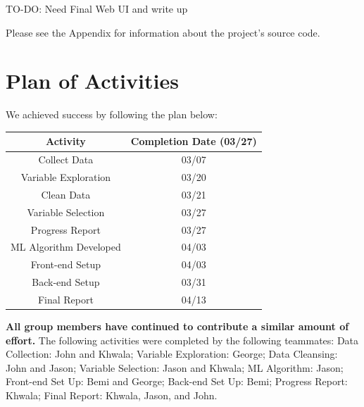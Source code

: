\documentclass[sigconf,nonacm,11pt]{acmart}
\begin{document}
\vspace{0.75em}
TO-DO: Need Final Web UI and write up

Please see the Appendix for information about the project's source code.




\section{Plan of Activities}

We achieved success by following the plan below:\vspace{0.07em}
\begin{center}
    \begin{tabular}{||c|c||}
    \hline
    Activity & Completion Date (03/27)\\
    \hline\hline
    Collect Data & 03/07\\
    Variable Exploration & 03/20\\
    Clean Data & 03/21\\
    Variable Selection & 03/27\\
    Progress Report & 03/27\\
    ML Algorithm Developed & 04/03\\
    Front-end Setup & 04/03\\
    Back-end Setup & 03/31\\
    Final Report & 04/13\\
    \hline
    \end{tabular}
\end{center}

\textbf{All group members have continued to contribute a similar amount of effort.} The following activities were completed by the following teammates: Data Collection: John and Khwala; Variable Exploration: George; Data Cleansing: John and Jason; Variable Selection: Jason and Khwala; ML Algorithm: Jason; Front-end Set Up: Bemi and George; Back-end Set Up: Bemi; Progress Report: Khwala; Final Report: Khwala, Jason, and John. 

\end{document}
